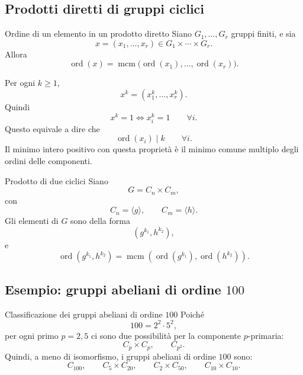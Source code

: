 \documentclass[a4paper]{article}
\begin{document}
\subsection{Prodotti diretti di gruppi ciclici}

\begin{radioactive}
\begin{snippetproposition}{Ordine di un elemento in un prodotto diretto}
    Siano \(G_1,\ldots,G_r\) gruppi finiti, e sia
    \[
        x=(x_1,\ldots,x_r)\in G_1\times\cdots\times G_r.
    \]
    Allora
    \[
        \operatorname{ord}(x)
        =
        \operatorname{mcm}\big(
            \operatorname{ord}(x_1),\ldots,\operatorname{ord}(x_r)
        \big).
    \]
\end{snippetproposition}
\end{radioactive}

\begin{radioactive}
\begin{snippetproof}{}
    Per ogni \(k\geq 1\),
    \[
        x^k=(x_1^k,\ldots,x_r^k).
    \]
    Quindi
    \[
        x^k=1
        \iff
        x_i^k=1
        \qquad
        \forall i.
    \]
    Questo equivale a dire che
    \[
        \operatorname{ord}(x_i)\mid k
        \qquad
        \forall i.
    \]
    Il minimo intero positivo con questa proprietà è il minimo comune multiplo degli ordini delle componenti.
\end{snippetproof}
\end{radioactive}

\begin{radioactive}
\begin{snippetexample}{Prodotto di due ciclici}
    Siano
    \[
        G=C_n\times C_m,
    \]
    con
    \[
        C_n=\langle g\rangle,
        \qquad
        C_m=\langle h\rangle.
    \]
    Gli elementi di \(G\) sono della forma
    \[
        (g^{k_1},h^{k_2}),
    \]
    e
    \[
        \operatorname{ord}(g^{k_1},h^{k_2})
        =
        \operatorname{mcm}
        \left(
            \operatorname{ord}(g^{k_1}),
            \operatorname{ord}(h^{k_2})
        \right).
    \]
\end{snippetexample}
\end{radioactive}

\subsection{Esempio: gruppi abeliani di ordine \(100\)}

\begin{radioactive}
\begin{snippetexample}{Classificazione dei gruppi abeliani di ordine \(100\)}
    Poiché
    \[
        100=2^2\cdot 5^2,
    \]
    per ogni primo \(p=2,5\) ci sono due possibilità per la componente \(p\)-primaria:
    \[
        C_p\times C_p,
        \qquad
        C_{p^2}.
    \]
    Quindi, a meno di isomorfismo, i gruppi abeliani di ordine \(100\) sono:
    \[
        C_{100},
        \qquad
        C_5\times C_{20},
        \qquad
        C_2\times C_{50},
        \qquad
        C_{10}\times C_{10}.
    \]
\end{snippetexample}
\end{radioactive}
\end{document}
